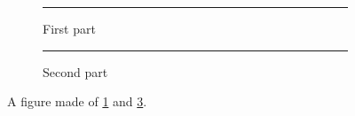 \documentclass{article}
\begin{document}
\begin{figure}[h]
\centering
\begin{subfigure}{0.45\textwidth}
\centering\rule{3cm}{2cm}
\caption{First part}\label{fig:sub-a}
\end{subfigure}
\hfill
\begin{subfigure}{0.45\textwidth}
\centering\rule{3cm}{2cm}
\caption{Second part}\label{fig:sub-b}
\end{subfigure}
\caption{A figure made of \ref{fig:sub-a} and \ref{fig:sub-b}.}
\end{figure}
\end{document}

